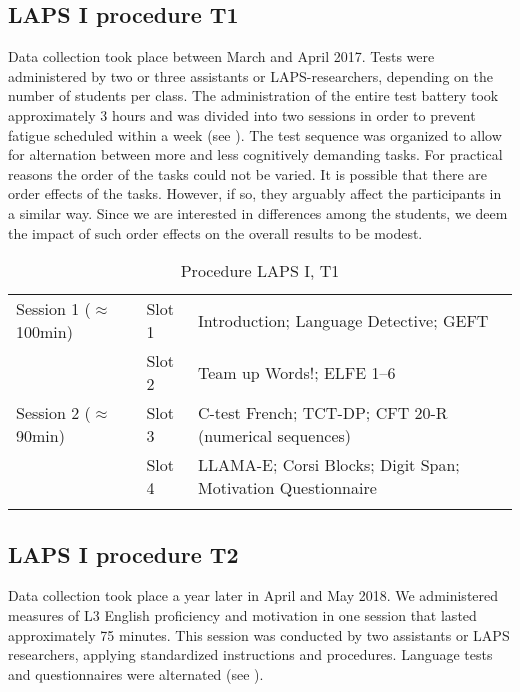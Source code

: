 \documentclass[output=paper]{langsci/langscibook}
\begin{document}
  \subsection{LAPS I procedure T1}


Data collection took place between March and April 2017. Tests were administered by two or three assistants or LAPS-researchers, depending on the number of students per class. The administration of the entire test battery took approximately 3 hours and was divided into two sessions in order to prevent fatigue scheduled within a week (see ). The test sequence was organized to allow for alternation between more and less cognitively demanding tasks. For practical reasons the order of the tasks could not be varied. It is possible that there are order effects of the tasks. However, if so, they arguably affect the participants in a similar way. Since we are interested in differences among the students, we deem the impact of such order effects on the overall results to be modest.


\begin{table}
\begin{tabularx}{\textwidth}{llQ}
\lsptoprule

Session 1 (${\approx}$100min) & Slot 1 & Introduction; Language Detective; GEFT\\
                              & Slot 2 & Team up Words!; ELFE 1--6\\
Session 2 (${\approx}$90min) & Slot 3 & C-test French; TCT-DP; CFT 20-R (numerical sequences)\\
                             & Slot 4 & LLAMA-E; Corsi Blocks; Digit Span; Motivation Questionnaire\\
\lspbottomrule
\end{tabularx}
\caption{Procedure LAPS I, T1\label{tab:02:3}}
\end{table}

\subsection{LAPS I procedure T2}


Data collection took place a year later in April and May 2018. We administered measures of L3 English proficiency and motivation in one session that lasted approximately 75 minutes. This session was conducted by two assistants or LAPS researchers, applying standardized instructions and procedures. Language tests and questionnaires were alternated (see ). 
\end{document}
